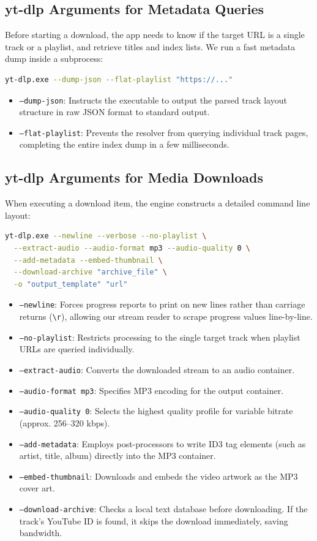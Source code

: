 \documentclass[12pt]{report}
\begin{document}
\subsection{yt-dlp Arguments for Metadata Queries}
Before starting a download, the app needs to know if the target URL is a single track or a playlist, and retrieve titles and index lists. We run a fast metadata dump inside a subprocess:
\begin{lstlisting}[language=bash]
yt-dlp.exe --dump-json --flat-playlist "https://..."
\end{lstlisting}
\begin{itemize}[leftmargin=*]
    \item \texttt{--dump-json}: Instructs the executable to output the parsed track layout structure in raw JSON format to standard output.
    \item \texttt{--flat-playlist}: Prevents the resolver from querying individual track pages, completing the entire index dump in a few milliseconds.
\end{itemize}

\subsection{yt-dlp Arguments for Media Downloads}
When executing a download item, the engine constructs a detailed command line layout:
\begin{lstlisting}[language=bash]
yt-dlp.exe --newline --verbose --no-playlist \
  --extract-audio --audio-format mp3 --audio-quality 0 \
  --add-metadata --embed-thumbnail \
  --download-archive "archive_file" \
  -o "output_template" "url"
\end{lstlisting}
\begin{itemize}[leftmargin=*]
    \item \texttt{--newline}: Forces progress reports to print on new lines rather than carriage returns (\texttt{\textbackslash{}r}), allowing our stream reader to scrape progress values line-by-line.
    \item \texttt{--no-playlist}: Restricts processing to the single target track when playlist URLs are queried individually.
    \item \texttt{--extract-audio}: Converts the downloaded stream to an audio container.
    \item \texttt{--audio-format mp3}: Specifies MP3 encoding for the output container.
    \item \texttt{--audio-quality 0}: Selects the highest quality profile for variable bitrate (approx. 256--320 kbps).
    \item \texttt{--add-metadata}: Employs post-processors to write ID3 tag elements (such as artist, title, album) directly into the MP3 container.
    \item \texttt{--embed-thumbnail}: Downloads and embeds the video artwork as the MP3 cover art.
    \item \texttt{--download-archive}: Checks a local text database before downloading. If the track's YouTube ID is found, it skips the download immediately, saving bandwidth.
\end{itemize}
\end{document}
